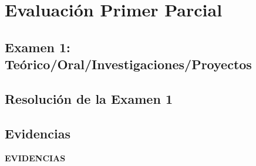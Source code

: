 \chapter{Evaluación Primer Parcial}
\newpage

\pagestyle{fancy} 


\vspace*{\fill}
{\centering
\section{Examen 1: Teórico/Oral/Investigaciones/Proyectos}}
\vspace*{\fill}



\vspace*{\fill}
{\centering
\section{Resolución de la Examen 1}}
\vspace*{\fill}




\clearpage
{}
\vspace*{\fill}
{\centering
	\section{Evidencias}}
\vspace*{\fill}

\clearpage


{\centering \textbf{EVIDENCIAS}}

